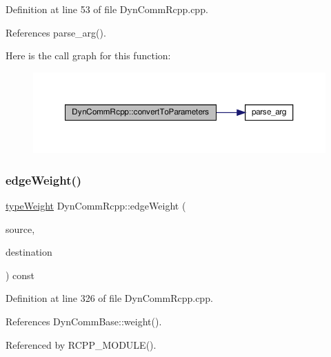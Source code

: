 Definition at line 53 of file Dyn\+Comm\+Rcpp.\+cpp.



References parse\+\_\+arg().

Here is the call graph for this function\+:
\nopagebreak
\begin{figure}[H]
\begin{center}
\leavevmode
\includegraphics[width=350pt]{classDynCommRcpp_a52692d421657ffcbe6a97762de9deddc_cgraph}
\end{center}
\end{figure}
\mbox{\label{classDynCommRcpp_a9a9aaf2512541f308d935e48c583f410}} 
\subsubsection{\texorpdfstring{edge\+Weight()}{edgeWeight()}}
{\footnotesize\ttfamily \hyperlink{edge_8h_a2e7ea3be891ac8b52f749ec73fee6dd2}{type\+Weight} Dyn\+Comm\+Rcpp\+::edge\+Weight (\begin{DoxyParamCaption}\item[{\hyperlink{edge_8h_a5fbd20c46956d479cb10afc9855223f6}{type\+Vertex}}]{source,  }\item[{\hyperlink{edge_8h_a5fbd20c46956d479cb10afc9855223f6}{type\+Vertex}}]{destination }\end{DoxyParamCaption}) const\hspace{0.3cm}{\ttfamily [inline]}}



Definition at line 326 of file Dyn\+Comm\+Rcpp.\+cpp.



References Dyn\+Comm\+Base\+::weight().



Referenced by R\+C\+P\+P\+\_\+\+M\+O\+D\+U\+L\+E().

